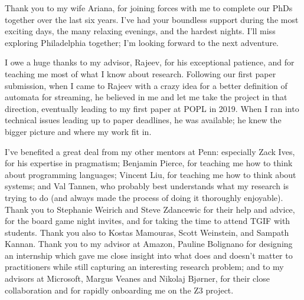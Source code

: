 Thank you to my wife Ariana, for joining forces with me to complete our PhDs together over the last six years.
I've had your boundless support during the most exciting days, the many relaxing evenings, and the hardest nights.
I'll miss exploring Philadelphia together; I'm looking forward to the next adventure.

I owe a huge thanks to my advisor, Rajeev, for his exceptional patience, and for teaching me most of what I know about research.
Following our first paper submission, when I came to Rajeev with a crazy idea for a better definition of automata for streaming, he believed in me and let me take the project in that direction, eventually leading to my first paper at POPL in 2019.
When I ran into technical issues leading up to paper deadlines, he was available; he knew the bigger picture and where my work fit in.

I've benefited a great deal from my other mentors at Penn: especially Zack Ives, for his expertise in pragmatism; Benjamin Pierce, for teaching me how to think about programming languages; Vincent Liu, for teaching me how to think about systems; and Val Tannen, who probably best understands what my research is trying to do (and always made the process of doing it thoroughly enjoyable).
Thank you to Stephanie Weirich and Steve Zdancewic for their help and advice, for the board game night invites, and for taking the time to attend TGIF with students.
Thank you also to Kostas Mamouras, Scott Weinstein, and Sampath Kannan.
Thank you to my advisor at Amazon, Pauline Bolignano for designing an internship which gave me close insight into what does and doesn't matter to practitioners while still capturing an interesting research problem; and to my advisors at Microsoft, Margus Veanes and Nikolaj Bjørner, for their close collaboration and for rapidly onboarding me on the Z3 project.

